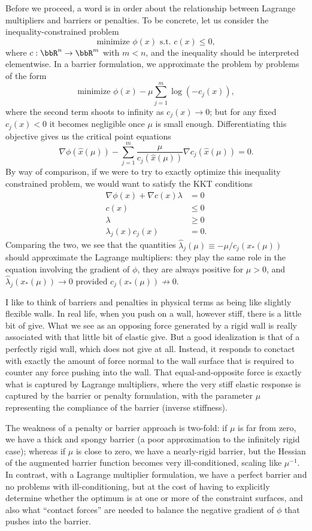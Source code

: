 \documentclass[12pt, leqno]{article} %
\begin{document}
Before we proceed, a word is in order about the relationship between
Lagrange multipliers and barriers or penalties.  To be concrete, let
us consider the inequality-constrained problem
\[
  \mbox{minimize } \phi(x) \mbox{ s.t.~} c(x) \leq 0,
\]
where $c : \bbR^n \rightarrow \bbR^m$ with $m < n$, and the inequality
should be interpreted elementwise.  In a barrier formulation, we
approximate the problem by problems of the form
\[
  \mbox{minimize } \phi(x) - \mu \sum_{j=1}^m \log(-c_j(x)),
\]
where the second term shoots to infinity as $c_j(x) \rightarrow 0$;
but for any fixed $c_j(x) < 0$ it becomes negligible once $\mu$ is
small enough.  Differentiating this objective gives us the critical
point equations
\[
  \nabla \phi(\hat{x}(\mu))
  -\sum_{j=1}^m \frac{\mu}{c_j(\hat{x}(\mu))} \nabla c_j(\hat{x}(\mu)) = 0.
\]
By way of comparison, if we were to try to exactly optimize this
inequality constrained problem, we would want to satisfy the KKT
conditions
\begin{align*}
  \nabla \phi(x) + \nabla c(x) \lambda &= 0 \\
  c(x) & \leq 0 \\
  \lambda & \geq 0 \\
  \lambda_j(x) c_j(x) &= 0.
\end{align*}
Comparing the two, we see that the quantities
$\hat{\lambda}_j(\mu) \equiv -\mu/c_j(x_*(\mu))$
should approximate the Lagrange multipliers: they play the same role
in the equation involving the gradient of $\phi$, they are always positive
for $\mu > 0$, and $\hat{\lambda}_j(x_*(\mu)) \rightarrow 0$ provided
$c_j(x_*(\mu)) \not \rightarrow 0$.

I like to think of barriers and penalties in physical terms as being
like slightly flexible walls.  In real life, when you push on a wall,
however stiff, there is a little bit of give.  What we see as an
opposing force generated by a rigid wall is really associated with
that little bit of elastic give.  But a good idealization is that of a
perfectly rigid wall, which does not give at all.  Instead, it
responds to conctact with exactly the amount of force normal to the
wall surface that is required to counter any force pushing into the
wall.  That equal-and-opposite force is exactly what is captured by
Lagrange multipliers, where the very stiff elastic response is
captured by the barrier or penalty formulation, with the parameter
$\mu$ representing the compliance of the barrier (inverse stiffness).

The weakness of a penalty or barrier approach is two-fold: if $\mu$ is
far from zero, we have a thick and spongy barrier (a poor
approximation to the infinitely rigid case); whereas if $\mu$ is close
to zero, we have a nearly-rigid barrier, but the Hessian of the
augmented barrier function becomes very ill-conditioned, scaling like
$\mu^{-1}$.  In contrast, with a Lagrange multiplier formulation, we
have a perfect barrier and no problems with ill-conditioning, but at
the cost of having to explicitly determine whether the optimum is at
one or more of the constraint surfaces, and also what ``contact
forces'' are needed to balance the negative gradient of $\phi$ that
pushes into the barrier.
\end{document}
